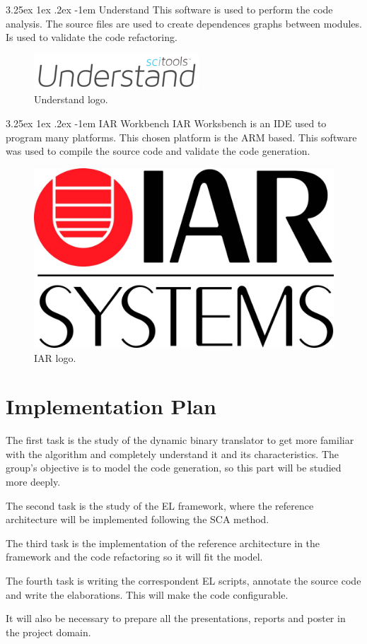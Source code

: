 \documentclass{report}
\makeatletter
\renewcommand\paragraph{\@startsection{paragraph}{5}{\z@}%
	{3.25ex \@plus1ex \@minus.2ex}%
	{-1em}%
	{\normalfont\normalsize\bfseries}}
\makeatother
\begin{document}
			\paragraph{Understand} This software is used to perform the code analysis. The source files are used to create dependences graphs between modules. Is used to validate the code refactoring. 
			
			\begin{figure} [H]
				\centering
				\includegraphics[width=0.3\linewidth]{Images/understand}
				\caption{Understand logo.}
				\label{fig:understand}
			\end{figure}
			
			\paragraph{IAR Workbench} IAR Worksbench is an IDE used to program many platforms. This chosen platform is the ARM based. This software was used to compile the source code and validate the code generation.
			
			\begin{figure} [H]
				\centering
				\includegraphics[width=0.2\linewidth]{Images/iar.jpg}
				\caption{IAR logo.}
				\label{fig:iar}
			\end{figure}

	\section{Implementation Plan}
	
	\par The first task is the study of the dynamic binary translator to get more familiar with the algorithm and completely understand it and its characteristics. The group's objective is to model the code generation, so this part will be studied more deeply.
	\par The second task is the study of the EL framework, where the reference architecture will be implemented following the SCA method.
	\par The third task is the implementation of the reference architecture in the framework and the code refactoring so it will fit the model. 
	\par The fourth task is writing the correspondent EL scripts, annotate the source code and write the elaborations. This will make the code configurable.
	\par It will also be necessary to prepare all the presentations, reports and poster in the project domain.
\end{document}

